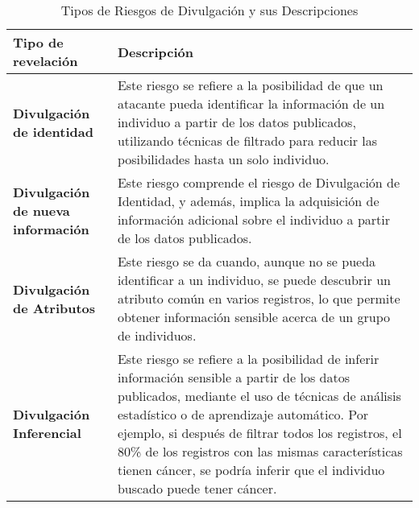 \begin{table}[H]
	\centering
	\caption{Tipos de Riesgos de Divulgación y sus Descripciones}
	\label{relevantes-definiciones}
    \begin{tabular}{|m{15em}|m{25em}|}
    \hline
    \rowcolor[gray]{0.8}
    Tipo de revelación & Descripción \\
    \hline
    \textbf{Divulgación de identidad} 
    & Este riesgo se refiere a la posibilidad de que un atacante pueda identificar la información de un individuo a partir de los datos publicados, utilizando técnicas de filtrado para reducir las posibilidades hasta un solo individuo.\\
    \hline
    \textbf{Divulgación de nueva información} 
    & Este riesgo comprende el riesgo de Divulgación de Identidad, y además, implica la adquisición de información adicional sobre el individuo a partir de los datos publicados.\\
    \hline
    \textbf{Divulgación de Atributos} 
    & Este riesgo se da cuando, aunque no se pueda identificar a un individuo, se puede descubrir un atributo común en varios registros, lo que permite obtener información sensible acerca de un grupo de individuos.\\
    \hline
    \textbf{Divulgación Inferencial} 
    & Este riesgo se refiere a la posibilidad de inferir información sensible a partir de los datos publicados, mediante el uso de técnicas de análisis estadístico o de aprendizaje automático. Por ejemplo, si después de filtrar todos los registros, el 80\% de los registros con las mismas características tienen cáncer, se podría inferir que el individuo buscado puede tener cáncer.\\
    \hline
    \end{tabular}
\end{table}


